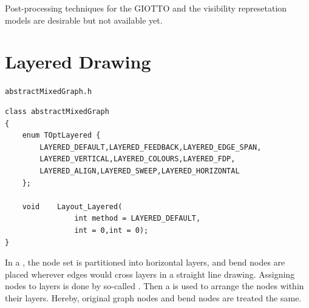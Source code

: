 \documentclass[a4paper,11pt,twoside]{book}
\begin{document}
\begin{multicols}{2}
Post-processing techniques for the GIOTTO and the visibility represetation
models are desirable but not available yet.


\section{Layered Drawing}
\label{slb_layered_drawing}
\myinclude\verb/abstractMixedGraph.h/
\begin{mymethods}
\begin{verbatim}
class abstractMixedGraph
{
    enum TOptLayered {
        LAYERED_DEFAULT,LAYERED_FEEDBACK,LAYERED_EDGE_SPAN,
        LAYERED_VERTICAL,LAYERED_COLOURS,LAYERED_FDP,
        LAYERED_ALIGN,LAYERED_SWEEP,LAYERED_HORIZONTAL
    };

    void    Layout_Layered(
                int method = LAYERED_DEFAULT,
                int = 0,int = 0);
}
\end{verbatim}
\end{mymethods}
In a , the node set is partitioned into horizontal layers,
and bend nodes are placed wherever edges would cross layers in a straight line
drawing. Assigning nodes to layers is done by so-called .
Then a  is used to arrange the nodes within their layers.
Hereby, original graph nodes and bend nodes are treated the same.


\end{multicols}
\end{document}
